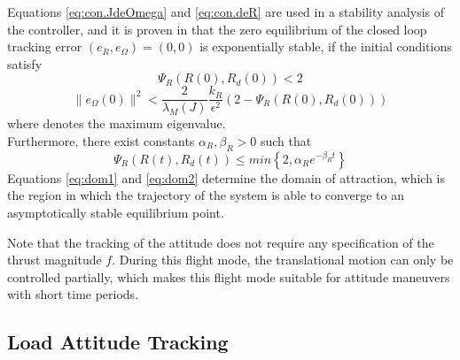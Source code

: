 Equations \ref{eq:con.JdeOmega} and \ref{eq:con.deR} are used in a stability analysis of the controller, and it is proven in \cite{Lee2010} 
that the zero equilibrium of the closed loop tracking error $ (e_R,e_\Omega)=(0,0) $ is exponentially stable, if the initial conditions satisfy
\begin{equation}\label{eq:dom1}
\Psi_R(R(0),R_d(0))<2
\end{equation}
\begin{equation}\label{eq:dom2}
\parallel e_\Omega(0)\parallel^2<\frac{2}{\lambda_M(J)}\frac{k_R}{\epsilon^2}(2-\Psi_R(R(0),R_d(0)))
\end{equation}
where  denotes the maximum eigenvalue. \\
Furthermore, there exist constants $ \alpha_R,\beta_R>0 $ such that
\begin{equation}\label{eq:con.proofPsiR}
\Psi_R(R(t),R_d(t)) \leq min\left\lbrace 2,\alpha_Re^{-\beta_Rt}\right\rbrace 
\end{equation}
Equations \ref{eq:dom1} and \ref{eq:dom2} determine the domain of attraction, which is the region in which the trajectory of the system is able to converge to an asymptotically stable equilibrium point. 

Note that the tracking of the  attitude does not require any specification of the thrust magnitude $ f $. During this flight mode, the translational motion can only be controlled partially, which makes this flight mode suitable for attitude maneuvers with short time periods.



\subsection{Load Attitude Tracking}\label{sec:con.loadatt}


